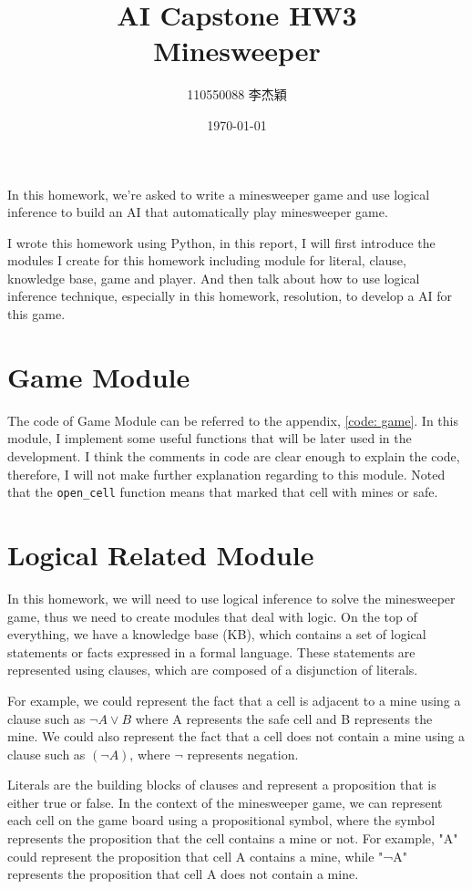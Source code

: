 \documentclass[twocolumn]{extarticle}
\title{AI Capstone HW3 \\ Minesweeper}
\author{110550088 李杰穎}
\date{\today}
\begin{document}
\maketitle


In this homework, we're asked to write a minesweeper game and use logical inference to build an AI that automatically play minesweeper game.

I wrote this homework using Python, in this report, I will first introduce the modules I create for this homework including module for literal, clause, knowledge base, game and player. And then talk about how to use logical inference technique, especially in this homework, resolution, to develop a AI for this game. 

\section{Game Module}

The code of Game Module can be referred to the appendix, \autoref{code: game}. In this module, I implement some useful functions that will be later used in the development. I think the comments in code are clear enough to explain the code, therefore, I will not make further explanation regarding to this module. Noted that the \texttt{open\_cell} function means that marked that cell with mines or safe.

\section{Logical Related Module}

In this homework, we will need to use logical inference to solve the minesweeper game, thus we need to create modules that deal with logic. On the top of everything, we have a knowledge base (KB), which contains a set of logical statements or facts expressed in a formal language. These statements are represented using clauses, which are composed of a disjunction of literals.

For example, we could represent the fact that a cell is adjacent to a mine using a clause such as $\neg A \lor B$ where A represents the safe cell and B represents the mine. We could also represent the fact that a cell does not contain a mine using a clause such as $(\neg A)$, where $\neg$ represents negation.

Literals are the building blocks of clauses and represent a proposition that is either true or false. In the context of the minesweeper game, we can represent each cell on the game board using a propositional symbol, where the symbol represents the proposition that the cell contains a mine or not. For example, "A" could represent the proposition that cell A contains a mine, while "¬A" represents the proposition that cell A does not contain a mine.
\end{document}

